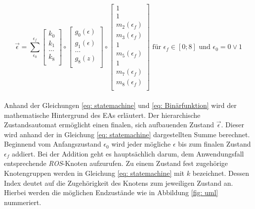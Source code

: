 	\begin{equation}
	\vec{\epsilon}=\sum_{\epsilon_0}^{\epsilon_f} \left[ \begin{array}{r}
	k_0  \\
	k_{1}  \\
	...  \\
	k_8  \\
	\end{array}\right] \circ
	\left[ \begin{array}{r}
	g_0(\epsilon)  \\
	g_{1}(\epsilon)  \\
	...  \\
	g_8(z)  \\
	\end{array}\right]  \circ
	\left[ \begin{array}{r}
	1  \\
	1  \\
	m_{2}(\epsilon_f)  \\
	m_{3}(\epsilon_f)   \\
	1  \\
	m_{5}(\epsilon_f)  \\
	1   \\
	m_{7}(\epsilon_f)   \\
	m_8(\epsilon_f)  \\
	\end{array}\right]
	\text{ für }\epsilon_f\in[0;8] \text{ und }\epsilon_0=0 \vee 1
	\label{eq: statemachine}
	\end{equation}\\
	
		Anhand der Gleichungen \ref{eq: statemachine} und \ref{eq: Binärfunktion} wird der mathematische Hintergrund des EAs erläutert. Der hierarchische Zustandsautomat ermöglicht einen finalen, sich aufbauenden Zustand $\vec{\epsilon}$. Dieser wird anhand der in Gleichung \ref{eq: statemachine} dargestellten Summe berechnet. Beginnend vom Anfangszustand $\epsilon_0$ wird jeder mögliche $\epsilon$ bis zum finalen Zustand $\epsilon_f$ addiert. Bei der Addition geht es hauptsächlich darum, dem Anwendungsfall entsprechende \textit{ROS}-Knoten aufzurufen. Zu einem Zustand fest zugehörige Knotengruppen werden in Gleichung \ref{eq: statemachine} mit $k$ bezeichnet. Dessen Index deutet auf die Zugehörigkeit des Knotens zum jeweiligen Zustand an. Hierbei werden die möglichen Endzustände wie in Abbildung \ref{fig: uml} nummeriert.\\
		
